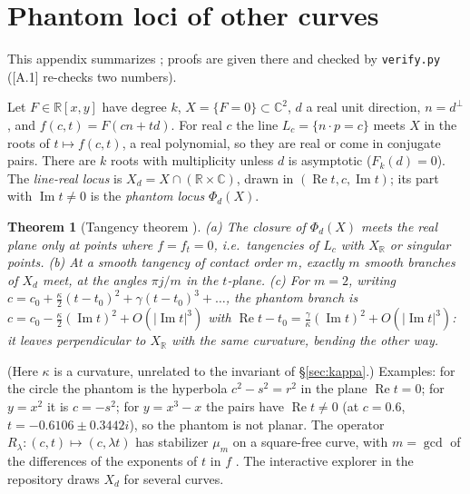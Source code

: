 \documentclass[11pt]{article}
\newtheorem{theorem}{Theorem}[section]\newtheorem{proposition}[theorem]{Proposition}
\theoremstyle{definition}\newtheorem{definition}[theorem]{Definition}\newtheorem{remark}[theorem]{Remark}\newtheorem{example}[theorem]{Example}
\newcommand{\C}{\mathbb{C}}\newcommand{\R}{\mathbb{R}}\newcommand{\PP}{\mathbb{P}}
\renewcommand{\Re}{\operatorname{Re}}\renewcommand{\Im}{\operatorname{Im}}
\begin{document}
\appendix
\section{Phantom loci of other curves}\label{app:phantom}
This appendix summarizes \cite{wu}; proofs are given there and checked by \texttt{verify.py} (\textsf{[A.1]} re-checks two numbers).

Let $F\in\R[x,y]$ have degree $k$, $X=\{F=0\}\subset\C^2$, $d$ a real unit direction, $n=d^\perp$, and $f(c,t)=F(cn+td)$. For real $c$ the line $L_c=\{n\cdot p=c\}$ meets $X$ in the roots of $t\mapsto f(c,t)$, a real polynomial, so they are real or come in conjugate pairs. There are $k$ roots with multiplicity unless $d$ is asymptotic ($F_k(d)=0$). The \emph{line-real locus} is $X_d=X\cap(\R\times\C)$, drawn in $(\Re t,c,\Im t)$; its part with $\Im t\ne0$ is the \emph{phantom locus} $\Phi_d(X)$.

\begin{theorem}[Tangency theorem \cite{wu}]
(a) The closure of $\Phi_d(X)$ meets the real plane only at points where $f=f_t=0$, i.e.\ tangencies of $L_c$ with $X_\R$ or singular points. (b) At a smooth tangency of contact order $m$, exactly $m$ smooth branches of $X_d$ meet, at the angles $\pi j/m$ in the $t$-plane. (c) For $m=2$, writing $c=c_0+\tfrac\kappa2(t-t_0)^2+\gamma(t-t_0)^3+\dots$, the phantom branch is $c=c_0-\tfrac\kappa2(\Im t)^2+O(|\Im t|^3)$ with $\Re t-t_0=\tfrac\gamma\kappa(\Im t)^2+O(|\Im t|^3)$: it leaves perpendicular to $X_\R$ with the same curvature, bending the other way.
\end{theorem}
(Here $\kappa$ is a curvature, unrelated to the invariant of §\ref{sec:kappa}.) Examples: for the circle the phantom is the hyperbola $c^2-s^2=r^2$ in the plane $\Re t=0$; for $y=x^2$ it is $c=-s^2$; for $y=x^3-x$ the pairs have $\Re t\ne0$ (at $c=0.6$, $t=-0.6106\pm0.3442i$), so the phantom is not planar. The operator $R_\lambda:(c,t)\mapsto(c,\lambda t)$ has stabilizer $\mu_m$ on a square-free curve, with $m=\gcd$ of the differences of the exponents of $t$ in $f$ \cite[Thm.~5]{wu}. The interactive explorer in the repository draws $X_d$ for several curves.
\end{document}
